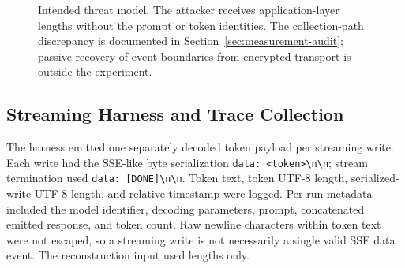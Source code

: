 \documentclass[electronics,article,submit,pdftex,moreauthors]{Definitions/mdpi}
\begin{document}
\begin{figure}[ht]
\centering
{}
\caption{Intended threat model. The attacker receives application-layer lengths without the prompt or token identities. The collection-path discrepancy is documented in Section~\ref{sec:measurement-audit}; passive recovery of event boundaries from encrypted transport is outside the experiment.}
\label{fig:threat_model}
\end{figure}

\subsection{Streaming Harness and Trace Collection}
The harness emitted one separately decoded token payload per streaming write. Each write had the SSE-like byte serialization \texttt{data: \textless token\textgreater\textbackslash n\textbackslash n}; stream termination used \texttt{data: [DONE]\textbackslash n\textbackslash n}. Token text, token UTF-8 length, serialized-write UTF-8 length, and relative timestamp were logged. Per-run metadata included the model identifier, decoding parameters, prompt, concatenated emitted response, and token count. Raw newline characters within token text were not escaped, so a streaming write is not necessarily a single valid SSE data event. The reconstruction input used lengths only.
\end{document}
